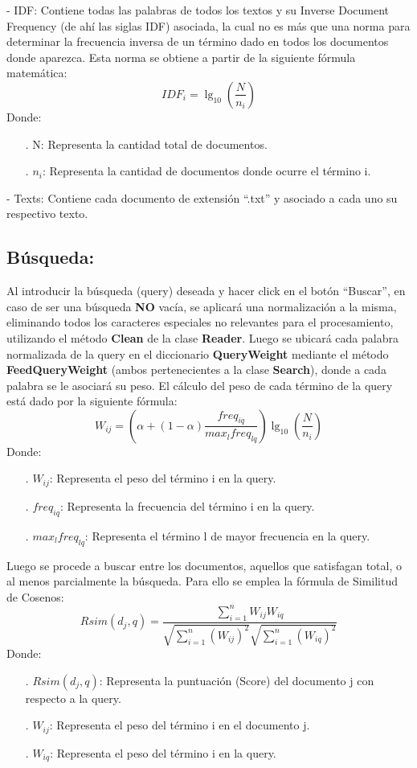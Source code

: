 \documentclass{article}
\begin{document}
- IDF: Contiene todas las palabras de todos los textos y su Inverse Document Frequency (de ahí las siglas IDF)
asociada, la cual no es más que una norma para determinar la frecuencia inversa de un término
dado en todos los documentos donde aparezca. Esta norma se obtiene a partir de la
siguiente fórmula matemática:
\newline
$$
	IDF_{i}=\lg_{10}{(\frac{N}{n_{i}})}
$$
\newline
Donde:
\begin{itemize}
	\item [.]N: Representa la cantidad total de documentos.
	\item [.]$n_{i}$: Representa la cantidad de documentos donde ocurre el término i.
\end{itemize}

- Texts: Contiene cada documento de extensión “.txt” y asociado a cada uno su respectivo texto.



\subsection{Búsqueda:}
Al introducir la búsqueda (query) deseada y hacer click en el botón “Buscar”, en caso de ser una
búsqueda \textbf{NO} vacía, se aplicará una normalización a la misma, eliminando todos los
caracteres especiales no relevantes para el procesamiento, utilizando el método \textbf{Clean} de la
clase \textbf{Reader}. Luego se ubicará cada palabra normalizada de la query en el
diccionario \textbf{QueryWeight} mediante el método \textbf{FeedQueryWeight} (ambos pertenecientes a la clase 
\textbf{Search}), donde a cada palabra se le asociará su peso. El cálculo del peso de cada término de la query 
está dado por la siguiente fórmula:
$$
	W_{ij}=(\alpha +(1-\alpha )\frac{freq_{iq}}{max_{l}freq_{lq}})\lg_{10}{(\frac{N}{n_{i}})}
$$
Donde:
\begin{itemize}
	\item [.]$W_{ij}$: Representa el peso del término i en la query.
	\item [.]$freq_{iq}$: Representa la frecuencia del término i en la query.
	\item [.]$max_{l}freq_{lq}$: Representa el término l de mayor frecuencia en la query.
\end{itemize}
Luego se procede a buscar entre los documentos, aquellos que satisfagan total, o al
menos parcialmente la búsqueda.
Para ello se emplea la fórmula de Similitud de Cosenos:
$$
	Rsim(d_{j},q)=\frac{\sum_{i = 1}^{n} W_{ij} W_{iq}}
	{\sqrt{\sum_{i = 1}^{n} (W_{ij})^2} \sqrt{\sum_{i = 1}^{n} (W_{iq})^2}}
$$
\newpage
Donde:
\begin{itemize}
	\item[.] $Rsim(d_{j},q)$: Representa la puntuación (Score) del documento j con respecto a la query.
	\item[.] $W_{ij}$: Representa el peso del término i en el documento j.
	\item[.] $W_{iq}$: Representa el peso del término i en la query.
\end{itemize}
\end{document}
